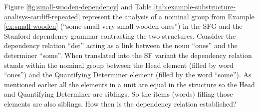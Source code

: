 
Figure \ref{fig:small-wooden-dependency} and Table \ref{tab:example-substructure-analisys-cardiff-repeated} represent the analysis of a nominal group from Example \ref{ex:small-wooden} (``some small very small wooden ones'') in the SFG and the Stanford dependency grammar contrasting the two structures. Consider the dependency relation ``det'' acting as a link between the noun ``ones'' and the determiner ``some''. When translated into the SF variant the dependency relation stands within the nominal group between the Head element (filled by word ``ones'') and the Quantifying Determiner element (filled by the word ``some''). As mentioned earlier all the elements in a unit are equal in the structure so the Head and Quantifying Determiner are siblings. So the items (words) filling those elements are also siblings. How then is the dependency relation established? 




